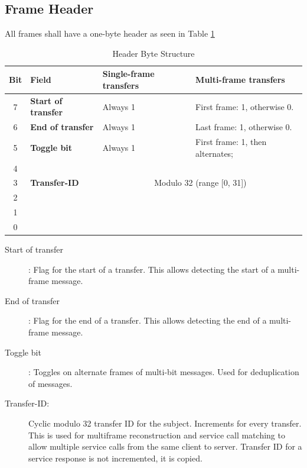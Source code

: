 \documentclass[a4paper,12pt]{article}
\begin{document}
\subsection{Frame Header}
All frames shall have a one-byte header as seen in Table \ref{tab:header-byte-structure}
\begin{table}[h]
\centering
\caption{Header Byte Structure}
\label{tab:header-byte-structure}
\renewcommand{\arraystretch}{1.3} %
\begin{tabular}[h]{|c|l|l|l|}
\hline
\textbf{Bit} & \textbf{Field} & \textbf{Single-frame transfers} & \textbf{Multi-frame transfers} \\
\hline
7 & \textbf{Start of transfer} & Always 1 & First frame: 1, otherwise 0. \\
\hline
6 & \textbf{End of transfer} & Always 1 & Last frame: 1, otherwise 0. \\
\hline
5 & \textbf{Toggle bit} & Always 1 & First frame: 1, then alternates; \\
\hline
4 & \multirow{3}{*}{\textbf{Transfer-ID}} & \multicolumn{2}{c|}{\multirow{3}{*}{\centering Modulo 32 (range [0, 31])}} \\
\cline{1-1}
3 & & \multicolumn{2}{c|}{} \\
\cline{1-1}
2 & & \multicolumn{2}{c|}{} \\
\cline{1-1}
1 &  & \multicolumn{2}{c|}{} \\
\cline{1-1}
0 &  & \multicolumn{2}{c|}{} \\
\hline
\end{tabular}
\end{table}

\begin{description}
    \item[Start of transfer]: Flag for the start of a transfer. This allows detecting the start of a multi-frame message.
    \item[End of transfer]: Flag for the end of a transfer. This allows detecting the end of a multi-frame message.
    \item[Toggle bit]: Toggles on alternate frames of multi-bit messages. Used for deduplication of messages.
    \item[Transfer-ID:] Cyclic modulo 32 transfer ID for the subject. Increments for every transfer. This is used for multiframe reconstruction and service call matching to allow multiple service calls from the same client to server. Transfer ID for a service response is not incremented, it is copied.
\end{description}
\end{document}

